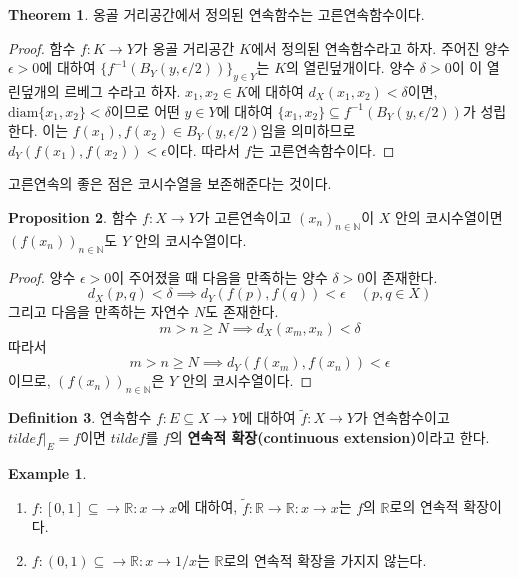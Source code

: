 \documentclass[11pt]{book}
\numberwithin{equation}{chapter}
\def\NN{\mathbb{N}}
\def\RR{\mathbb{R}}
\def\eps{\epsilon}
\def\diam{\text{diam}}
\theoremstyle{definition}
\newtheorem{thm}{Theorem}[section]
\newtheorem{prop}[thm]{Proposition}
\newtheorem{defn}[thm]{Definition}
\newtheorem*{ex}{Example}
\newenvironment{enum}
	{\begin{enumerate}[label=(\alph*), leftmargin=2\parindent]}
	{\end{enumerate}}
\begin{document}
\begin{thm}
    옹골 거리공간에서 정의된 연속함수는 고른연속함수이다.
\end{thm}
\begin{proof}
    함수 \(f : K \to Y\)가 옹골 거리공간 \(K\)에서 정의된 연속함수라고 하자. 주어진 양수 \(\eps > 0\)에 대하여 \(\{f^{-1}(B_Y(y, \eps/2))\}_{y \in Y}\)는 \(K\)의 열린덮개이다. 양수 \(\delta > 0\)이 이 열린덮개의 르베그 수라고 하자. \(x_1, x_2 \in K\)에 대하여 \(d_X(x_1, x_2) < \delta\)이면, \(\diam \{x_1, x_2\} < \delta\)이므로 어떤 \(y \in Y\)에 대하여 \(\{x_1, x_2\} \subseteq f^{-1}(B_Y(y, \eps/2))\)가 성립한다. 이는 \(f(x_1), f(x_2) \in B_Y(y, \eps/2)\)임을 의미하므로 \(d_Y(f(x_1), f(x_2)) < \eps\)이다. 따라서 \(f\)는 고른연속함수이다.
\end{proof}

고른연속의 좋은 점은 코시수열을 보존해준다는 것이다.

\begin{prop} \label{prop 7.4.5}
    함수 \(f : X \to Y\)가 고른연속이고 \((x_n)_{n \in \NN}\)이 \(X\) 안의 코시수열이면 \((f(x_n))_{n \in \NN}\)도 \(Y\) 안의 코시수열이다.
\end{prop}
\begin{proof}
    양수 \(\eps > 0\)이 주어졌을 때 다음을 만족하는 양수 \(\delta > 0\)이 존재한다.
    \[
    d_X(p, q) < \delta \implies d_Y(f(p), f(q)) < \eps \quad (p, q \in X)    
    \]
    그리고 다음을 만족하는 자연수 \(N\)도 존재한다.
    \[
    m > n \ge N \implies d_X(x_m, x_n) < \delta    
    \]
    따라서
    \[
        m > n \ge N \implies d_Y(f(x_m), f(x_n)) < \eps
    \]
    이므로, \((f(x_n))_{n \in \NN}\)은 \(Y\) 안의 코시수열이다.
\end{proof}

\begin{defn}
    연속함수 \(f : E \subseteq X \to Y\)에 대하여 \(\tilde{f} : X \to Y\)가 연속함수이고 \(tilde{f} \vert_E = f\)이면 \(tilde{f}\)를 \(f\)의 \textbf{연속적 확장(continuous extension)}이라고 한다.
\end{defn}

\begin{ex}
    \quad

    \begin{enum}
        \item \(f : [0, 1] \subseteq \to \RR : x \to x\)에 대하여, \(\tilde{f} : \RR \to \RR : x \to x\)는 \(f\)의 \(\RR\)로의 연속적 확장이다.
        \item \(f : (0, 1) \subseteq \to \RR : x \to 1/x\)는 \(\RR\)로의 연속적 확장을 가지지 않는다.
    \end{enum}
\end{ex}
\end{document}
